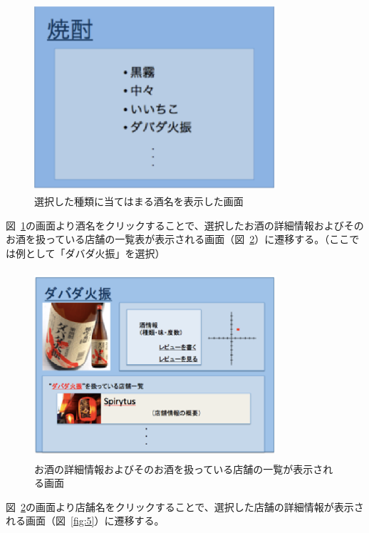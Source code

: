 \documentclass[a4j,titlepage]{jarticle}
\begin{document}
\begin {figure}[!htbp]
    \begin{center}
    \includegraphics [height=7cm, width=9cm]{3.eps}
      \caption {選択した種類に当てはまる酒名を表示した画面}
    \label {fig:3}
    \end{center}
\end {figure}
図~\ref{fig:3}の画面より酒名をクリックすることで、選択したお酒の詳細情報およびそのお酒を扱っている店舗の一覧表が表示される画面（図~\ref{fig:4}）に遷移する。（ここでは例として「ダバダ火振」を選択）
\clearpage
\begin {figure}[!htbp]
    \begin{center}
    \includegraphics [height=7cm, width=9cm]{4.eps}
    \caption {お酒の詳細情報およびそのお酒を扱っている店舗の一覧が表示される画面}
    \label {fig:4}
    \end{center}
\end {figure}



図~\ref{fig:4}の画面より店舗名をクリックすることで、選択した店舗の詳細情報が表示される画面（図~\ref{fig:5}）に遷移する。
\end{document}
